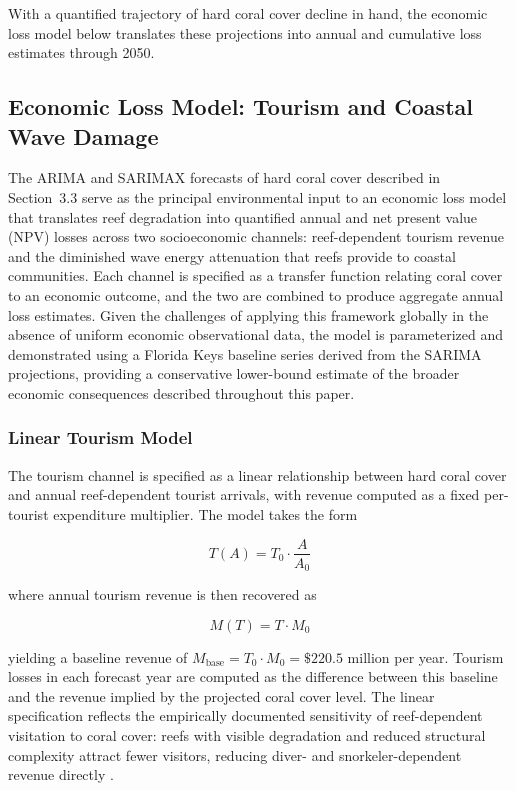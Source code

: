 \documentclass[10pt,letterpaper]{article}
\begin{document}
With a quantified trajectory of hard coral cover decline in hand, the economic loss model below translates these projections into annual and cumulative loss estimates through 2050.

\subsection{Economic Loss Model: Tourism and Coastal Wave Damage}

The ARIMA and SARIMAX forecasts of hard coral cover described in Section~3.3 serve as the principal environmental input to an economic loss model that translates reef degradation into quantified annual and net present value (NPV) losses across two socioeconomic channels: reef-dependent tourism revenue and the diminished wave energy attenuation that reefs provide to coastal communities. Each channel is specified as a transfer function relating coral cover to an economic outcome, and the two are combined to produce aggregate annual loss estimates. Given the challenges of applying this framework globally in the absence of uniform economic observational data, the model is parameterized and demonstrated using a Florida Keys baseline series derived from the SARIMA projections, providing a conservative lower-bound estimate of the broader economic consequences described throughout this paper.

\subsubsection{Linear Tourism Model}

The tourism channel is specified as a linear relationship between hard coral cover and annual reef-dependent tourist arrivals, with revenue computed as a fixed per-tourist expenditure multiplier. The model takes the form

\begin{equation}
T(A) = T_0 \cdot \frac{A}{A_0}
\end{equation}

\noindent where annual tourism revenue is then recovered as

\begin{equation}
M(T) = T \cdot M_0
\end{equation}

\noindent yielding a baseline revenue of $M_{\text{base}} = T_0 \cdot M_0 = \$220.5$ million per year. Tourism losses in each forecast year are computed as the difference between this baseline and the revenue implied by the projected coral cover level. The linear specification reflects the empirically documented sensitivity of reef-dependent visitation to coral cover: reefs with visible degradation and reduced structural complexity attract fewer visitors, reducing diver- and snorkeler-dependent revenue directly \cite{noaa_2026_econ}.
\end{document}
